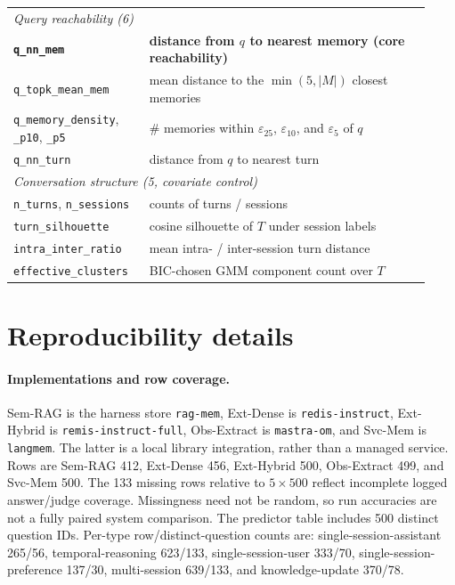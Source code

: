 \documentclass{article}
\begin{document}
\begin{table}[h]
\begin{tabular}{p{0.30\linewidth}p{0.63\linewidth}}
    \midrule
    \multicolumn{2}{l}{\emph{Query reachability (6)}}\\
    \textbf{\texttt{q\_nn\_mem}} & \textbf{distance from $q$ to nearest memory (core reachability)} \\
    \texttt{q\_topk\_mean\_mem} & mean distance to the $\min(5,|M|)$ closest memories \\
    \texttt{q\_memory\_density}, \texttt{\_p10}, \texttt{\_p5} & \# memories within $\varepsilon_{25}$, $\varepsilon_{10}$, and $\varepsilon_5$ of $q$ \\
    \texttt{q\_nn\_turn} & distance from $q$ to nearest turn \\
    \midrule
    \multicolumn{2}{l}{\emph{Conversation structure (5, covariate control)}}\\
    \texttt{n\_turns}, \texttt{n\_sessions} & counts of turns / sessions \\
    \texttt{turn\_silhouette} & cosine silhouette of $T$ under session labels \\
    \texttt{intra\_inter\_ratio} & mean intra- / inter-session turn distance \\
    \texttt{effective\_clusters} & BIC-chosen GMM component count over $T$ \\
    \bottomrule
  \end{tabular}
\end{table}

\section{Reproducibility details}
\label{app:repro}

\paragraph{Implementations and row coverage.}
Sem-RAG is the harness store \texttt{rag-mem}, Ext-Dense is
\texttt{redis-instruct}, Ext-Hybrid is \texttt{remis-instruct-full},
Obs-Extract is \texttt{mastra-om}, and Svc-Mem is \texttt{langmem}.
The latter is a local library integration, rather than a managed service.
Rows are Sem-RAG 412, Ext-Dense 456, Ext-Hybrid 500, Obs-Extract 499,
and Svc-Mem 500. The 133 missing rows relative to $5\times500$
reflect incomplete logged answer/judge coverage.
Missingness need not be random, so run accuracies are not a fully paired
system comparison. The predictor table includes 500 distinct question IDs.
Per-type row/distinct-question counts are:
single-session-assistant 265/56, temporal-reasoning 623/133,
single-session-user 333/70, single-session-preference 137/30,
multi-session 639/133, and knowledge-update 370/78.
\end{document}
